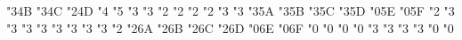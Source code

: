 {  \mathchardef\strictfi             "3\hex\txsycfam 4B
  \mathchardef\strictiff            "3\hex\txsycfam 4C
  \mathchardef\invamp               "2\hex\txsycfam 4D
  \edef\lbag{\delimiter "4\hex\txsycfam 4E\hex\txexafam 30 }%
  \edef\rbag{\delimiter "5\hex\txsycfam 4F\hex\txexafam 31 }%
  \mathchardef\Lbag                 "4\hex{}
  \mathchardef\Rbag                 "5\hex{}
  \mathchardef\circledless          "3\hex{}
  \mathchardef\circledgtr           "3\hex{}
  \mathchardef\circledwedge         "2\hex{}
  \mathchardef\circledvee           "2\hex{}
  \mathchardef\circledbar           "2\hex{}
  \mathchardef\circledbslash        "2\hex{}
  \mathchardef\lJoin                "3\hex{}
  \mathchardef\rJoin                "3\hex{}
  \mathchardef\Join                 "3\hex\txsycfam 5A
  \let\lrJoin=\Join
  \mathchardef\openJoin             "3\hex\txsycfam 5B
  \mathchardef\lrtimes              "3\hex\txsycfam 5C
  \mathchardef\opentimes            "3\hex\txsycfam 5D
  \mathchardef\Diamond              "0\hex\txsycfam 5E
  \mathchardef\Diamondblack         "0\hex\txsycfam 5F
  \mathchardef\nplus                "2\hex{}
  \mathchardef\nsqsubset            "3\hex{}
  \mathchardef\nsqsupset            "3\hex{}
  \mathchardef\dashleftarrow        "3\hex{}
  \mathchardef\dashrightarrow       "3\hex{}
  \let\dasharrow\dashrightarrow
  \mathchardef\dashleftrightarrow   "3\hex{}
  \mathchardef\leftsquigarrow       "3\hex{}
  \mathchardef\ntwoheadrightarrow   "3\hex{}
  \mathchardef\ntwoheadleftarrow    "3\hex{}
  \mathchardef\boxast               "2\hex{}
  \mathchardef\boxbslash            "2\hex\txsycfam 6A
  \mathchardef\boxbar               "2\hex\txsycfam 6B
  \mathchardef\boxslash             "2\hex\txsycfam 6C
  \mathchardef\Wr                   "2\hex\txsycfam 6D
  \mathchardef\lambdaslash          "0\hex\txsycfam 6E
  \mathchardef\lambdabar            "0\hex\txsycfam 6F
  \mathchardef\varclubsuit          "0\hex{}
  \mathchardef\vardiamondsuit       "0\hex{}
  \mathchardef\varheartsuit         "0\hex{}
  \mathchardef\varspadesuit         "0\hex{}
  \mathchardef\Nearrow              "3\hex{}
  \mathchardef\Searrow              "3\hex{}
  \mathchardef\Nwarrow              "3\hex{}
  \mathchardef\Swarrow              "3\hex{}
  \mathchardef\Top                  "0\hex{}
  \mathchardef\Bot                  "0\hex{}
}
